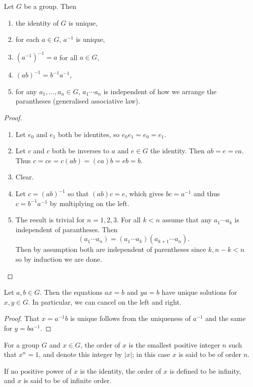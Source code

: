 \begin{proposition}
Let $G$ be a group. Then
\begin{enumerate}[label=(\arabic*)]
\item the identity of $G$ is unique,
\item for each $a\in G$, $a^{-1}$ is unique,
\item $(a^{-1})^{-1}=a$ for all $a\in G$,
\item $(ab)^{-1}=b^{-1}a^{-1}$,
\item for any $a_1,\dots,a_n\in G$, $a_1\cdots a_n$ is independent of how we arrange the parantheses (generalised associative law).
\end{enumerate}
\end{proposition}

\begin{proof} \
\begin{enumerate}[label=(\arabic*)]
\item Let $e_0$ and $e_1$ both be identites, so $e_0e_1=e_0=e_1$.
\item Let $c$ and $c$ both be inverses to $a$ and $e\in G$ the identity. Then $ab = e = ca$. Thus $c = ce = c(ab) =
(ca)b = eb = b$.
\item Clear.
\item Let $c=(ab)^{-1}$ so that $(ab)c=e$, which gives $bc=a^{-1}$ and thus $c=b^{-1}a^{-1}$ by multiplying on the left.
\item The result is trivial for $n=1,2,3$. For all $k<n$ assume that any $a_1\cdots a_k$ is independent of parantheses. Then
\[(a_1\cdots a_n)=(a_1\cdots a_k)(a_{k+1}\cdots a_n).\]
Then by assumption both are independent of parentheses since $k,n-k<n$ so by induction we are done.
\end{enumerate}
\end{proof}

\begin{proposition}
Let $a,b\in G$. Then the equations $ax=b$ and $ya=b$ have unique solutions for $x,y\in G$. In particular, we can cancel on the left and right.
\end{proposition}
\begin{proof}
That $x=a^{-1}b$ is unique follows from the uniqueness of $a^{-1}$ and the same for $y=ba^{-1}$.
\end{proof}

\begin{definition}[Order]
For a group $G$ and $x\in G$, the order of $x$ is the smallest positive integer $n$ such that $x^n=1$, and denote this integer by $|x|$; in this case $x$ is said to be of order $n$.

If no positive power of $x$ is the identity, the order of $x$ is defined to be infinity, and $x$ is said to be of infinite order.
\end{definition}

